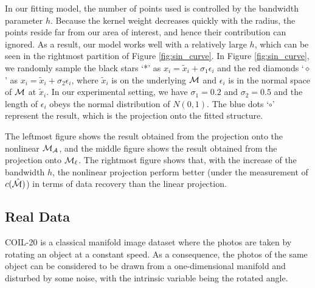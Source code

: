 \documentclass{article}
\theoremstyle{remark}
\begin{document}
In our fitting model, the number of points used is controlled by the bandwidth parameter $h$. Because the kernel weight decreases quickly with the radius, the points reside far from our area of interest, and hence their contribution can ignored. As a result, our model works well with a relatively large $h$, which can be seen in the rightmost partition of Figure \eqref{fig:sin_curve}. In Figure \eqref{fig:sin_curve}, we randomly sample the black stars `*' as $x_i = \tilde{x}_i+\sigma_1\epsilon_i$ and the red diamonds `$\diamond$' as $x_i = \tilde{x}_i+\sigma_2\epsilon_i$, where $\tilde{x}_i$ is on the underlying $\cal M$ and $\epsilon_i$ is in the normal space of $\cal M$ at $\tilde{x}_i$. In our experimental setting, we have $\sigma_1=0.2$ and $\sigma_2=0.5$ and the length of $\epsilon_i$ obeys the normal distribution of $N(0,1)$. The blue dots `$\circ$' represent the result, which is the projection onto the fitted structure. 

The leftmost figure shows the result obtained from the projection onto the nonlinear $\cal M_A$, and the middle figure shows the result obtained from the projection onto $\cal M_\ell$.
The rightmost figure shows that, with the increase of the bandwidth $h$, the nonlinear projection perform  better (under the measurement of $c({\hat{\cal M}})$) in terms of data recovery than the linear projection.

\subsection{Real Data}
COIL-20 \cite{COIL-20} is a classical manifold image dataset where the photos are taken by rotating an object at a constant speed. As a consequence, the photos of the same object can be considered to be  drawn from a one-dimensional manifold and disturbed by some noise, with the intrinsic variable being the rotated angle. %
\end{document}
